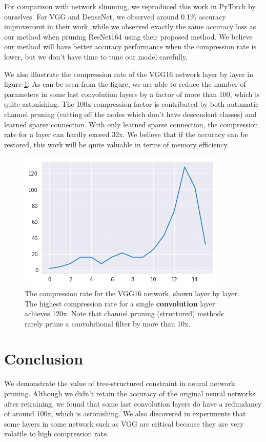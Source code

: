 \documentclass{acmtog} %
\begin{document}
For comparison with network slimming, we reproduced this work in PyTorch by ourselves. For VGG and DenseNet, we observed around 0.1\% accuracy improvement in their work, while we observed exactly the same accuracy loss as our method when pruning ResNet164 using their proposed method. We believe our method will have better accuracy performance when the compression rate is lower, but we don't have time to tune our model carefully.

We also illustrate the compression rate of the VGG16 network layer by layer in figure \ref{fig:comp}. As can be seen from the figure, we are able to reduce the number of parameters in some last convolution layers by a factor of more than 100, which is quite astonishing. The 100x compression factor is contributed by both automatic channel pruning (cutting off the nodes which don't have descendent classes) and learned sparse connection. With only learned sparse connection, the compression rate for a layer can hardly exceed 32x. We believe that if the accuracy can be restored, this work will be quite valuable in terms of memory efficiency.

\begin{figure}
\centering
\includegraphics[width=\linewidth]{assets/compression.png}
\caption{The compression rate for the VGG16 network, shown layer by layer. The highest compression rate for a single \textbf{convolution} layer achieves 120x. Note that channel pruning (structured) methods rarely prune a convolutional filter by more than 10x.}
\label{fig:comp}
\end{figure}

\section{Conclusion}
We demonstrate the value of tree-structured constraint in neural network pruning. Although we didn't retain the accuracy of the original neural networks after retraining, we found that some last convolution layers do have a redundancy of around 100x, which is astonishing. We also discovered in experiments that some layers in some network such as VGG are critical because they are very volatile to high compression rate.
\end{document}
